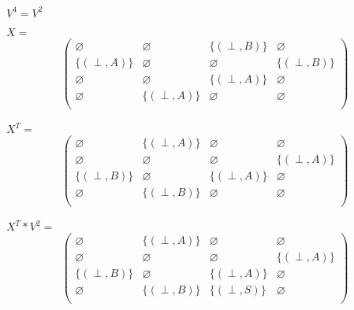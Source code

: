 \documentclass[12pt]{article}  %
\theoremstyle{definition}
\theoremstyle{remark}
\begin{document}
$V^4 = V^2$


$X=$
\begin{align*}
\begin{pmatrix}
      \varnothing            & \varnothing            & \{ (\perp,B) \}            & \varnothing            \\
      \{ (\perp,A) \}        & \varnothing            & \varnothing                & \{ (\perp,B) \}            \\
      \varnothing            & \varnothing            & \{ (\perp,A) \}            & \varnothing      \\
      \varnothing            & \{ (\perp,A) \}            & \varnothing      & \varnothing  \\
\end{pmatrix}
\end{align*}

$X^T=$
\begin{align*}
\begin{pmatrix}
      \varnothing            & \{ (\perp,A) \}        & \varnothing            & \varnothing            \\
      \varnothing            & \varnothing            & \varnothing                & \{ (\perp,A) \}            \\
      \{ (\perp,B) \}        & \varnothing            & \{ (\perp,A) \}            & \varnothing      \\
      \varnothing            & \{ (\perp,B) \}            & \varnothing      & \varnothing  \\
\end{pmatrix}
\end{align*}



$X^T*V^2=$
\begin{align*}
\begin{pmatrix}
      \varnothing            & \{ (\perp,A) \}            & \varnothing            & \varnothing            \\
      \varnothing            & \varnothing            & \varnothing                & \{ (\perp,A) \}            \\
      \{ (\perp,B) \}            & \varnothing            & \{ (\perp,A) \}            & \varnothing      \\
      \varnothing            & \{ (\perp,B) \}            & \{ (\perp,S) \}      & \varnothing  \\
\end{pmatrix}
\end{align*}
\end{document}
